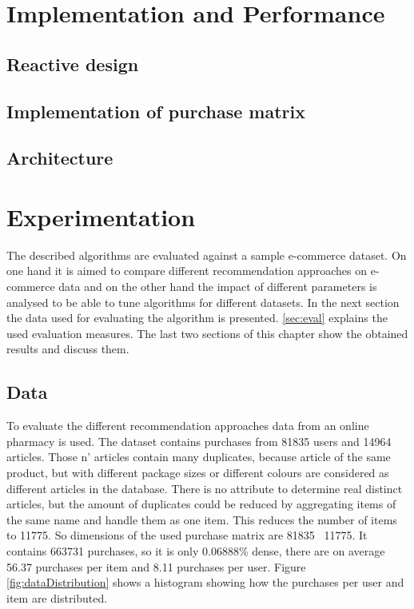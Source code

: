 \documentclass[10pt]{reportMaster}
\begin{document}
\chapter{Implementation and Performance}

\section{Reactive design}

\section{Implementation of purchase matrix}

\section{Architecture}








\chapter{Experimentation}
The described algorithms are evaluated against a sample e-commerce dataset.
On one hand it is aimed to compare different recommendation approaches on e-commerce data and on the other hand the impact of different parameters is analysed to be able to tune algorithms for different datasets.
In the next section the data used for evaluating the algorithm is presented.
\ref{sec:eval} explains the used evaluation measures.
The last two sections of this chapter show the obtained results and discuss them.

\section{Data}
To evaluate the different recommendation approaches data from an online pharmacy is used.
The dataset contains purchases from 81835 users and 14964 articles.
Those n' articles contain many duplicates, because article of the same product, but with different package sizes or different colours are considered as different articles in the database.
There is no attribute to determine real distinct articles, but the amount of duplicates could be reduced by aggregating items of the same name and handle them as one item.
This reduces the number of items to 11775.
So dimensions of the used purchase matrix are 81835 \texttimes \ 11775.
It contains 663731 purchases, so it is only 0.06888\% dense, there are on average 56.37 purchases per item and 8.11 purchases per user. %
Figure \ref{fig:dataDistribution} shows a histogram showing how the purchases per user and item are distributed.
\end{document}

